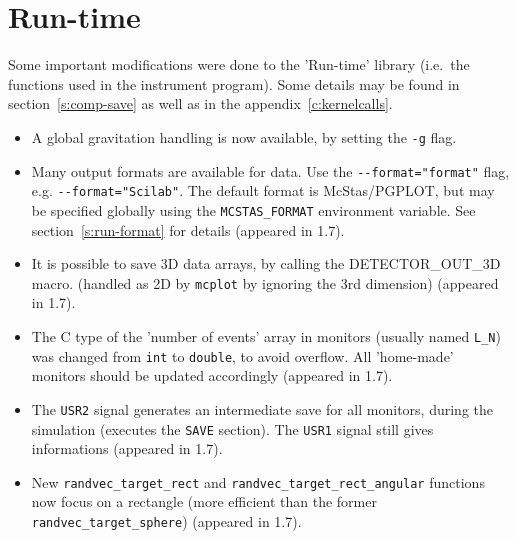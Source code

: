 
\section{Run-time} 
\label{s:new-features:run-time}

Some important modifications were done to the 'Run-time' library 
(i.e.\ the functions used in the instrument program). 
Some details may be found in section~\ref{s:comp-save} 
as well as in the appendix~\ref{c:kernelcalls}.

\begin{itemize}
\item A global gravitation handling is now available, by setting the \verb+-g+ flag.
\item Many output formats are available for data. Use the
    \verb+--format="format"+ flag, e.g. \verb+--format="Scilab"+.  The default
    format is McStas/PGPLOT, but may be specified globally using the
    \verb+MCSTAS_FORMAT+ environment variable.  See section~\ref{s:run-format}
    for details (appeared in 1.7). 
\item It is possible to save 3D data arrays, by calling the DETECTOR\_OUT\_3D
    macro. (handled as 2D by \verb+mcplot+ by ignoring the 3rd dimension)
    (appeared in 1.7).  
\item The C type of the 'number of events' array in monitors (usually named
    \verb+L_N+) was changed from \verb+int+ to \verb+double+, to avoid overflow.
    All 'home-made' monitors should be updated accordingly (appeared in 1.7).
\item The \verb+USR2+ signal generates an intermediate save for all monitors,
    during the simulation (executes the \texttt{SAVE} section). The \verb+USR1+
    signal still gives informations (appeared in 1.7). 
\item New \verb+randvec_target_rect+ and \verb+randvec_target_rect_angular+
    functions now focus  on a rectangle (more efficient than the former
    \verb+randvec_target_sphere+) (appeared in 1.7).
\end{itemize}


